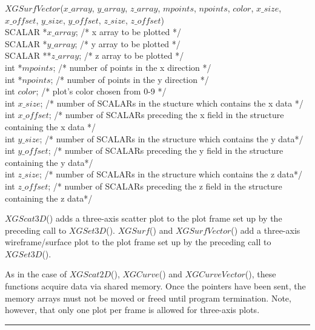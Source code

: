 \begin{flushleft}
$XGSurfVector$($x\_array$, $y\_array$, $z\_array$, $mpoints$,
$npoints$, $color$, $x\_size$, $x\_offset$, $y\_size$, $y\_offset$, $z\_size$, $z\_offset$) \\
SCALAR   *$x\_array$;    /* x array to be plotted                         */ \\
SCALAR   *$y\_array$;    /* y array to be plotted                         */ \\
SCALAR  **$z\_array$;    /* z array to be plotted                         */ \\
int     *$mpoints$;    /* number of points in the x direction            */ \\
int     *$npoints$;    /* number of points in the y direction            */ \\
int      $color$;      /* plot's color chosen from 0-9
*/ \\
int      $x\_size$;      /* number of SCALARs in the stucture which
contains the x data	*/ \\
int      $x\_offset$;      /* number of SCALARs preceding the x field
in the structure containing the x data		*/ \\
int      $y\_size$;      /* number of SCALARs in the structure which
	contains the y data*/ \\
int      $y\_offset$;      /* number of SCALARs preceding the y field
 in the structure containing the y data*/ \\
int      $z\_size$;      /* number of SCALARs in the structure which
	contains the z data*/ \\
int      $z\_offset$;      /* number of SCALARs preceding the z field
 in the structure containing the z data*/
\end{flushleft}

$XGScat3D$() adds a three-axis scatter plot to the plot frame set up by the
preceding call to $XGSet3D$().  $XGSurf$() and $XGSurfVector$() add a
three-axis wireframe/surface plot to the plot frame set up by the preceding call to $XGSet3D$().

As in the case of $XGScat2D$(),  $XGCurve$() and $XGCurveVector$(), these functions acquire data
via shared memory.  Once the pointers have been sent, the memory arrays must
not be moved or freed until program termination.  Note, however, that only
one plot per frame is allowed for three-axis plots.

\newpage

\def\xlen{4in}
\begin{minipage}{\xlen}
\begin{flushright}
\rule{\xlen}{.5pt}
\end{flushright}
\end{minipage}

